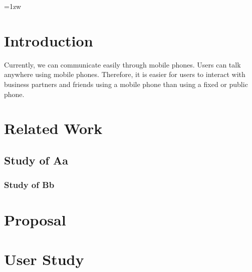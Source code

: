 \documentclass[a4paper]{report}
\subtitle{—図書館情報メディア研究科の場合—}{: A Case Study at the Graduate School of Library, Information, and Media Studies}
\begin{document}
\makecover

\addtolength{\textheight}{-5mm}	%
\setlength{\footskip}{15mm}	%
\fontsize{11pt}{15pt}\selectfont

\pagebreak\setcounter{page}{1}
\pagestyle{plain}
\tableofcontents
\listoffigures

\parindent=1zw	%
\pagebreak\setcounter{page}{1}
\pagestyle{plain}


\chapter{Introduction}
Currently, we can communicate easily through mobile phones. Users can talk anywhere using mobile phones. Therefore, it is easier for users to interact with business partners and friends using a mobile phone than using a fixed or public phone. \cite{xu2017deep}

\chapter{Related Work}
\section{Study of Aa}
\subsection{Study of Bb}

\chapter{Proposal}

\chapter{User Study}
\end{document}

